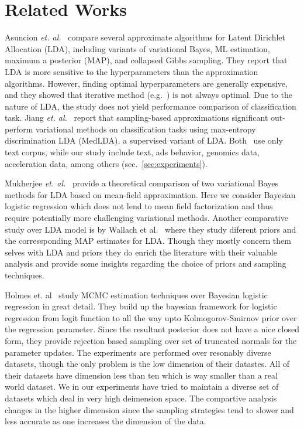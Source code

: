 \section{Related Works}

Asuncion {\it et. al.}~\cite{Asuncion2009smoothing} compare several
approximate algorithms for Latent Dirichlet Allocation (LDA), including
variants of variational Bayes, ML estimation, maximum a posterior (MAP), and
collapsed Gibbs sampling. They report that LDA is more sensitive to the
hyperparameters than the approximation algorithms. However, finding optimal
hyperparameters are generally expensive, and they showed that iterative method
(e.g.~\cite{Minka00}) is not always optimal. Due to the nature of LDA, the
study does not yield performance comparison of classification task. Jiang {\it
et. al.}~\cite{medlda_MCMC12} report that sampling-based approximations
significant out-perform variational methods on classification tasks using
max-entropy discrimination LDA (MedLDA), a supervised variant of LDA.
Both~\cite{Asuncion2009smoothing, medlda_MCMC12} use only text corpus, while
our study include text, ads behavior, genomics data, acceleration data, among
others (sec.~\ref{sec:experiments}). 

Mukherjee {\it et. al.}~\cite{Mukherjee08} provide a theoretical comparison of
two variational Bayes methods for LDA based on mean-field approximation. Here
we consider Bayesian logistic regression which does not lend to mean field
factorization and thus require potentially more challenging variational
methods. Another comparative study over LDA model is by Wallach et
al.~\cite{WallachMM09} where they study diferent priors and the 
corressponding MAP estimates for LDA. Though
they mostly concern them selves with LDA and priors they do enrich the
literature with their valuable analysis and provide some insights regarding the
choice of priors and sampling techniques. 

Holmes et. al~\cite{Holmes} study MCMC estimation techniques over Bayesian logistic
regression in great detail. They build up the bayesian framework for logistic
regression from logit function to all the way upto Kolmogorov-Smirnov prior over
the regression parameter. Since the resultant posterior does not have a nice
closed form,  they provide  rejection based sampling over set of truncated
normals for the parameter updates. The experiments are performed over resonably
diverse datasets, though the only problem is the low dimension of their
datastes. All of their datasets have dimension less than ten which is way
smaller than a real world dataset. We in our experiments have tried to maintain
a diverse set of datasets which deal in very high deimension space. The
compartive analysis changes in the higher dimension since the sampling
strategies tend to slower and less accurate as one increases the dimension of
the data. 

